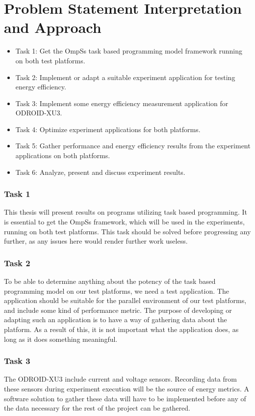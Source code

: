 \section{Problem Statement Interpretation and Approach}
\begin{itemize}
  \item Task 1: Get the OmpSs task based programming model framework running on both test platforms.
  \item Task 2: Implement or adapt a suitable experiment application for testing energy efficiency.
  \item Task 3: Implement some energy efficiency measurement application for ODROID-XU3.
  \item Task 4: Optimize experiment applications for both platforms.
  \item Task 5: Gather performance and energy efficiency results from the experiment applications on both platforms.
  \item Task 6: Analyze, present and discuss experiment results.
\end{itemize}

\subsubsection{Task 1}
This thesis will present results on programs utilizing task based programming.
It is essential to get the OmpSs framework, which will be used in the experiments, running on both test platforms.
This task should be solved before progressing any further, as any issues here would render further work useless.

\subsubsection{Task 2}
To be able to determine anything about the potency of the task based programming model on our test platforms, we need a test application.
The application should be suitable for the parallel environment of our test platforms, and include some kind of performance metric.
The purpose of developing or adapting such an application is to have a way of gathering data about the platform.
As a result of this, it is not important what the application does, as long as it does something meaningful.

\subsubsection{Task 3}
The ODROID-XU3 include current and voltage sensors.
Recording data from these sensors during experiment execution will be the source of energy metrics.
A software solution to gather these data will have to be implemented before any of the data necessary for the rest of the project can be gathered.

